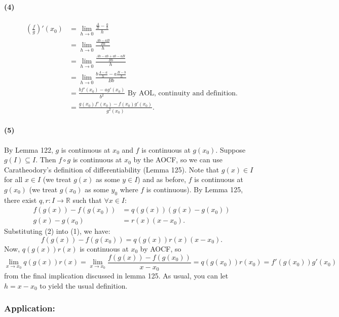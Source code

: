 \documentclass{article}
\begin{document}
\paragraph{(4)}
\begin{align*}
\left( \frac{f}{g} \right) '(x_0) &= \lim_{h \to 0}\frac{\frac{A}{B}-\frac{a}{b}}{h} \\
&= \lim_{h \to 0}\frac{\frac{Ab-aB}{Bb}}{h} \\
&= \lim_{h \to 0}\frac{\frac{Ab-ab+ab-aB}{Bb}}{h} \\
&= \lim_{h \to 0}\frac{b \frac{A-a}{h} - a \frac{B-b}{h}}{Bb} \\
&= \frac{bf'(x_0)-ag'(x_0)}{b^2} \text{ By AOL, continuity and definition.} \\
&= \frac{g(x_0)f'(x_0)-f(x_0)g'(x_0)}{g^2(x_0)}.
\end{align*}
\paragraph{(5)}
By Lemma 122, $g$ is continuous at $x_0$ and $f$ is continuous at $g(x_0)$.
Suppose $g(I) \subseteq I$. Then $f \circ g$ is continuous at $x_0$ by the AOCF,
so we can use Caratheodory's definition of differentiability (Lemma 125). Note that
$g(x) \in I$ for all  $x \in I$ (we treat $g(x)$ as some $y \in I$)
and as before, $f$ is continuous at $g(x_0)$ (we treat $g(x_0)$ as some $y_0$ where $f$ is continuous).
By Lemma 125, there exist $q,r:I \to \mathbb{R}$ such that $\forall x \in I$:
\begin{align}
f(g(x))-f(g(x_0)) &= q(g(x))(g(x)-g(x_0)) \\
g(x)-g(x_0) &= r(x)(x-x_0).
\end{align}
Substituting (2) into (1), we have: \[
f(g(x))-f(g(x_0)) = q(g(x))r(x)(x-x_0).
\]
Now, $q(g(x))r(x)$ is continuous at $x_0$ by AOCF, so \[
\lim_{x \to x_0}q(g(x))r(x) = \lim_{x \to x_0}\frac{f(g(x))-f(g(x_0))}{x-x_0} = q(g(x_0))r(x_0) = f'(g(x_0))g'(x_0)
\]
from the final implication discussed in lemma 125. As usual, you can let $h=x-x_0$ to yield the usual definition.
\subsubsection*{Application:}
\end{document}
